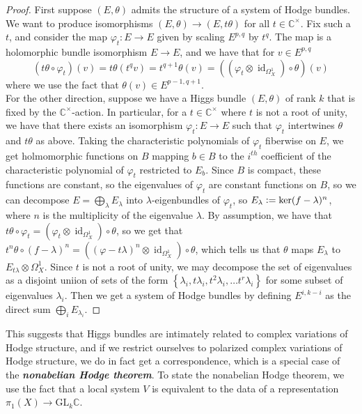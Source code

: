 \documentclass[psamsfonts, 12pt]{amsart}
\theoremstyle{definition}
\theoremstyle{remark}
\newcommand{\ib}[1]{\textbf{\textit{#1}}}
\newcommand{\C}{\mathbb{C}}
\newcommand{\GL}{\mathrm{GL}}
\newcommand{\set}[1]{\left\lbrace #1 \right\rbrace}
\newcommand{\defeq}{\vcentcolon=}
\DeclareMathOperator{\id}{id}
\begin{document}
%
\begin{proof}
First suppose $(E,\theta)$ admits the structure of a system of Hodge bundles.
We want to produce isomorphisms $(E,\theta) \to (E,t\theta)$ for all
$t \in \C^\times$. Fix such a $t$, and consider the map $\varphi_t : E \to E$ given
by scaling $E^{p,q}$ by $t^q$. The map is a holomorphic bundle isomorphism
$E \to E$, and we have that for $v \in E^{p,q}$
\[
(t\theta\circ \varphi_t)(v) = t\theta(t^qv) = t^{q+1}\theta(v) =
((\varphi_t \otimes \id_{\Omega^1_X}) \circ \theta)(v)
\]
where we use the fact that $\theta(v) \in E^{p-1,q+1}$. \\

For the other direction, suppose we have a Higgs bundle $(E,\theta)$ of rank $k$
that is fixed by the $\C^\times$-action. In particular, for a $t \in \C^\times$
where $t$ is not a root of unity, we have that there exists an isomorphism
$\varphi_t : E \to E$ such that $\varphi_t$ intertwines $\theta$ and $t\theta$
as above. Taking the characteristic polynomials of $\varphi_t$
fiberwise on $E$, we get holmomorphic functions on $B$ mapping $b \in B$
to the $i^{th}$ coefficient of the characteristic polynomial of $\varphi_t$
restricted to $E_b$. Since $B$ is compact, these functions are constant,
so the eigenvalues of $\varphi_t$ are constant functions on $B$, so we
can decompose $E = \bigoplus_{\lambda}E_\lambda$ into $\lambda$-eigenbundles
of $\varphi_t$, so $E_\lambda \defeq \ker(f-\lambda)^n$, where $n$ is the multiplicity
of the eigenvalue $\lambda$. By assumption, we have that
$t\theta \circ \varphi_t = (\varphi_t \otimes \id_{\Omega^1_X}) \circ\theta$,
so we get that
$t^n\theta\circ (f-\lambda)^n=((\varphi-t\lambda)^n\otimes\id_{\Omega^1_X})\circ \theta$, which tells us that $\theta$ maps $E_\lambda$ to
$E_{t\lambda} \otimes \Omega^1_X$. Since $t$ is not a root of unity, we
may decompose the set of eigenvalues as a disjoint uniion of sets of the form
$\set{\lambda_i, t\lambda_i, t^2\lambda_i, \ldots t^r\lambda_i}$ for some subset
of eigenvalues $\lambda_i$. Then we get a system of Hodge bundles by
defining $E^{i,k-i}$ as the direct sum $\bigoplus_i E_{\lambda_i}$.
\end{proof}
%
This suggests that Higgs bundles are intimately related to complex variations
of Hodge structure, and if we restrict ourselves to polarized complex
variations of Hodge structure, we do in fact get a correspondence, which is a
special case of the \ib{nonabelian Hodge theorem}. To state the
nonabelian Hodge theorem, we use the fact that a local system $V$
is equivalent to the data of a representation $\pi_1(X) \to \GL_k\C$.
\end{document}
